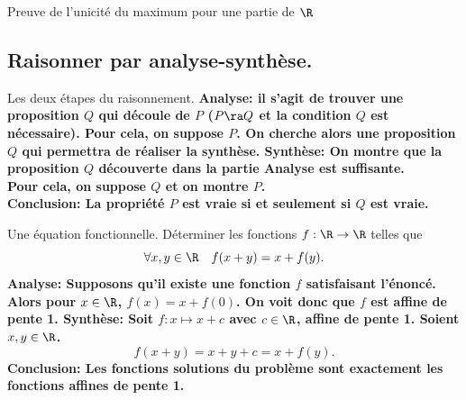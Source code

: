 \documentclass[11pt]{article}
\begin{document}
\begin{ex}{}{}
    Preuve de l'unicité du maximum pour une partie de $\R$
\end{ex}

\subsection{Raisonner par analyse-synthèse.}

\begin{meth}{Les deux étapes du raisonnement.}{}
    \bf{Analyse:} il s'agit de trouver une proposition $Q$ qui découle de $P$ ($P\ra Q$ et la condition $Q$ est nécessaire). Pour cela, on suppose $P$. On cherche alors une proposition $Q$ qui permettra de réaliser la synthèse.\n
    \bf{Synthèse:} On montre que la proposition $Q$ découverte dans la partie Analyse est suffisante.\\
    Pour cela, on suppose $Q$ et on montre $P$.\\
    \bf{Conclusion:} La propriété $P$ est vraie si et seulement si $Q$ est vraie.
\end{meth}

\begin{ex}{Une équation fonctionnelle.}{}
    Déterminer les fonctions $f:\R\to\R$ telles que
    \begin{equation*}
        \forall x,y\in \R \quad f(x+y) = x+f(y).
    \end{equation*}
    \tcblower
    \bf{Analyse:} Supposons qu'il existe une fonction $f$ satisfaisant l'énoncé. Alors pour $x\in\R$, $f(x)=x+f(0)$. On voit donc que $f$ est affine de pente 1.\n
    \bf{Synthèse:} Soit $f:x\mapsto x+c$ avec $c\in \R$, affine de pente 1. Soient $x,y\in\R$.
    \begin{equation*}
        f(x+y)=x+y+c=x+f(y).
    \end{equation*}
    \bf{Conclusion:} Les fonctions solutions du problème sont exactement les fonctions affines de pente 1.
\end{ex}

\pagebreak
\end{document}
